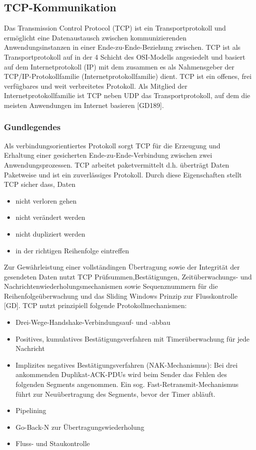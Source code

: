 \color{process}

\subsection{TCP-Kommunikation}
Das Transmission Control Protocol (TCP) ist ein Transportprotokoll und ermöglicht eine Datenaustausch zwischen kommunizierenden Anwendungsinstanzen in einer Ende-zu-Ende-Beziehung zwischen. TCP ist als Transportprotokoll auf in der 4 Schicht des OSI-Modells angesiedelt und basiert auf dem Internetprotokoll (IP) mit dem zusammen es als Nahmensgeber der TCP/IP-Protokollfamilie (Internetprotokollfamilie) dient.
TCP ist ein offenes, frei verfügbares und weit verbreitetes Protokoll. Als Mitglied der Internetprotokollfamilie ist TCP neben UDP das Transportprotokoll, auf dem die meisten Anwendungen im Internet basieren [GD189].
\subsubsection{Gundlegendes}
Als verbindungsorientiertes Protokoll sorgt TCP für die Erzeugung und Erhaltung einer gesicherten 
Ende-zu-Ende-Verbindung zwischen zwei Anwendungsprozessen. TCP arbeitet paketvermittelt d.h. überträgt Daten Paketweise und ist ein zuverlässiges Protokoll.
Durch diese Eigenschaften stellt TCP sicher dass, Daten
\begin{itemize}
	\item{nicht verloren gehen}
	\item{nicht verändert werden}
	\item{nicht dupliziert werden}
	\item{in der richtigen Reihenfolge eintreffen}
\end{itemize}
Zur Gewährleistung einer vollständingen Übertragung sowie der Integrität der gesendeten Daten nutzt TCP Prüfsummen,Bestätigungen, Zeitüberwachungs- und Nachrichtenwiederholungsmechanismen sowie Sequenznummern für die Reihenfolgeüberwachung und das Sliding Windows Prinzip zur Flusskontrolle [GD].
\newline
TCP nutzt prinzipiell folgende Protokollmechanismen:
\begin{itemize}
	\item{Drei-Wege-Handshake-Verbindungsauf- und -abbau}
	\item{Positives, kumulatives Bestätigungsverfahren mit Timerüberwachung für jede Nachricht}
	\item{Implizites negatives Bestätigungsverfahren (NAK-Mechanismus): Bei drei ankommenden Duplikat-ACK-PDUs wird beim Sender das Fehlen des folgenden Segments angenommen. Ein sog. Fast-Retransmit-Mechanismus führt zur Neuübertragung des Segments, bevor der Timer abläuft.}
	\item{Pipelining}
	\item{Go-Back-N zur Übertragungswiederholung}
	\item{Fluss- und Staukontrolle}
\end{itemize}
